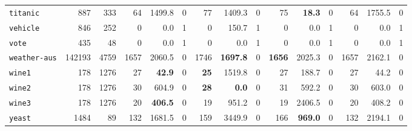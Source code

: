 \begin{tabular}{lccrrrrrrrrrrrr}
\texttt{titanic} & \multicolumn{1}{r}{887} & \multicolumn{1}{r}{333}  & 64 & 1499.8 & 0 & 77 & 1409.3 & 0 & 75 & \textbf{18.3} & 0 & 64 & 1755.5 & 0\\
\texttt{vehicle} & \multicolumn{1}{r}{846} & \multicolumn{1}{r}{252}  & 0 & 0.0 & 1 & 0 & 150.7 & 1 & 0 & 0.0 & 1 & 0 & 0.0 & 1\\
\texttt{vote} & \multicolumn{1}{r}{435} & \multicolumn{1}{r}{48}  & 0 & 0.0 & 1 & 0 & 0.0 & 1 & 0 & 0.0 & 1 & 0 & 0.0 & 1\\
\texttt{weather-aus} & \multicolumn{1}{r}{142193} & \multicolumn{1}{r}{4759}  & 1657 & 2060.5 & 0 & 1746 & \textbf{1697.8} & 0 & \textbf{1656} & 2025.3 & 0 & 1657 & 2162.1 & 0\\
\texttt{wine1} & \multicolumn{1}{r}{178} & \multicolumn{1}{r}{1276}  & 27 & \textbf{42.9} & 0 & \textbf{25} & 1519.8 & 0 & 27 & 188.7 & 0 & 27 & 44.2 & 0\\
\texttt{wine2} & \multicolumn{1}{r}{178} & \multicolumn{1}{r}{1276}  & 30 & 604.9 & 0 & \textbf{28} & \textbf{0.0} & 0 & 31 & 592.2 & 0 & 30 & 603.0 & 0\\
\texttt{wine3} & \multicolumn{1}{r}{178} & \multicolumn{1}{r}{1276}  & 20 & \textbf{406.5} & 0 & 19 & 951.2 & 0 & 19 & 2406.5 & 0 & 20 & 408.2 & 0\\
\texttt{yeast} & \multicolumn{1}{r}{1484} & \multicolumn{1}{r}{89}  & 132 & 1681.5 & 0 & 159 & 3449.9 & 0 & 166 & \textbf{969.0} & 0 & 132 & 2194.1 & 0\\
\bottomrule
\end{tabular}
